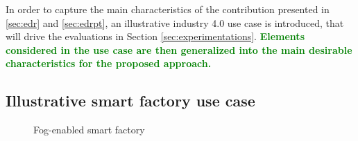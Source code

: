 \documentclass{iosart2c}
\newcommand{\added}[1]{\textcolor{green}{\textbf{#1}}}
\begin{document}
In order to capture the main characteristics of the contribution presented in \textsection \ref{sec:edr} and \textsection \ref{sec:edrpt}, an illustrative industry 4.0 use case is introduced, that will drive the evaluations in Section \textsection \ref{sec:experimentations}.
\added{Elements considered in the use case are then generalized into the main desirable characteristics for the proposed approach.}

\subsection{Illustrative smart factory use case}
\label{sec:distribution_use_case}

\begin{figure}
	\centering
	\caption{Fog-enabled smart factory}
	\label{fig:usecase}
\end{figure}
\end{document}
